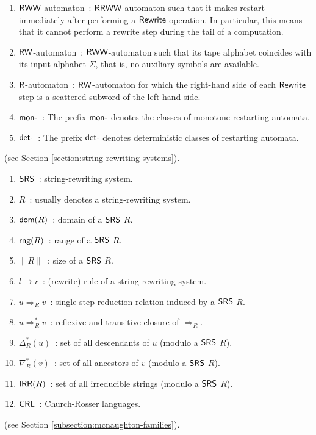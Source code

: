 \begin{enumerate}[]
\item $\textup{\sf RWW}$-automaton\ : $\textup{\sf RRWW}$-automaton such that it makes restart immediately after performing a $\textup{\sf Rewrite}$ operation. In particular, this means that it cannot perform a rewrite step during the tail of a computation.
\item $\textup{\sf RW}$-automaton\ : $\textup{\sf RWW}$-automaton such that its tape alphabet coincides with its input alphabet $\Sigma$, that is, no auxiliary symbols are available.
\item $\textup{\sf R}$-automaton\ : $\textup{\sf RW}$-automaton for which the right-hand side of each $\textup{\sf Rewrite}$ step is a scattered subword of the left-hand side.
\item $\textup{\sf mon-}$\ : The prefix $\textup{\sf mon-}$ denotes the classes of monotone restarting automata.
\item $\textup{\sf det-}$\ : The prefix $\textup{\sf det-}$ denotes deterministic classes of restarting automata.
\end{enumerate}

 (see Section \ref{section:string-rewriting-systems}).

\begin{enumerate}[]
\item $\textup{\sf SRS}$\ : string-rewriting system.
\item $R$\ : usually denotes a string-rewriting system.
\item $\textup{\sf dom}(R)$\ : domain of a $\textup{\sf SRS}$ $R$.
\item $\textup{\sf rng}(R)$\ : range of a $\textup{\sf SRS}$ $R$.
\item $\|R\|$\ : size of a $\textup{\sf SRS}$ $R$.
\item $l \to r$\ : (rewrite) rule of a string-rewriting system.
\item $u \Rightarrow_R v$\ : single-step reduction relation induced by a $\textup{\sf SRS}$ $R$.
\item $u \Rightarrow_R^* v$\ : reflexive and transitive closure of $\Rightarrow_R$.
\item $\Delta_R^*(u)$\ : set of all descendants of $u$ (modulo a $\textup{\sf SRS}$ $R$).
\item $\nabla_R^*(v)$\ : set of all ancestors of $v$ (modulo a $\textup{\sf SRS}$ $R$).
\item $\textup{\sf IRR}(R)$\ : set of all irreducible strings (modulo a $\textup{\sf SRS}$ $R$).
\item $\textup{\sf CRL}$\ : Church-Rosser languages.
\end{enumerate}

 (see Section \ref{subsection:mcnaughton-families}).

